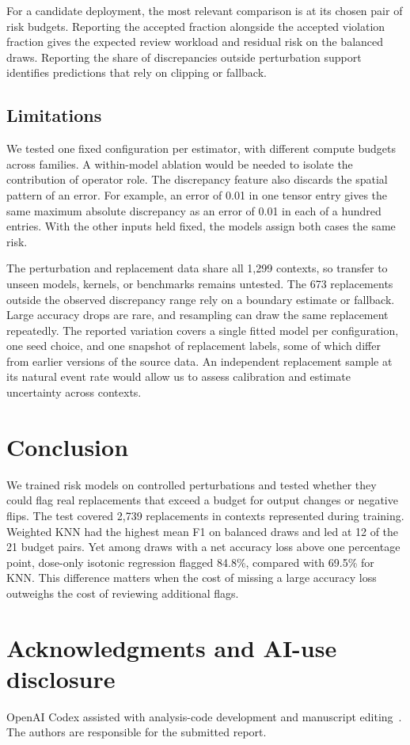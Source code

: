 \documentclass{article}
\begin{document}
For a candidate deployment, the most relevant comparison is at its chosen pair of risk budgets. Reporting the accepted fraction alongside the accepted violation fraction gives the expected review workload and residual risk on the balanced draws. Reporting the share of discrepancies outside perturbation support identifies predictions that rely on clipping or fallback.

\subsection{Limitations}

We tested one fixed configuration per estimator, with different compute budgets across families. A within-model ablation would be needed to isolate the contribution of operator role. The discrepancy feature also discards the spatial pattern of an error. For example, an error of 0.01 in one tensor entry gives the same maximum absolute discrepancy as an error of 0.01 in each of a hundred entries. With the other inputs held fixed, the models assign both cases the same risk.

The perturbation and replacement data share all 1,299 contexts, so transfer to unseen models, kernels, or benchmarks remains untested. The 673 replacements outside the observed discrepancy range rely on a boundary estimate or fallback. Large accuracy drops are rare, and resampling can draw the same replacement repeatedly. The reported variation covers a single fitted model per configuration, one seed choice, and one snapshot of replacement labels, some of which differ from earlier versions of the source data. An independent replacement sample at its natural event rate would allow us to assess calibration and estimate uncertainty across contexts.

\section{Conclusion}

We trained risk models on controlled perturbations and tested whether they could flag real replacements that exceed a budget for output changes or negative flips. The test covered 2,739 replacements in contexts represented during training. Weighted KNN had the highest mean F1 on balanced draws and led at 12 of the 21 budget pairs. Yet among draws with a net accuracy loss above one percentage point, dose-only isotonic regression flagged 84.8\%, compared with 69.5\% for KNN. This difference matters when the cost of missing a large accuracy loss outweighs the cost of reviewing additional flags.

\section*{Acknowledgments and AI-use disclosure}
OpenAI Codex assisted with analysis-code development and manuscript editing~\citep{openai_codex}. The authors are responsible for the submitted report.

{\footnotesize
\clearpage
\scriptsize


}
\end{document}
